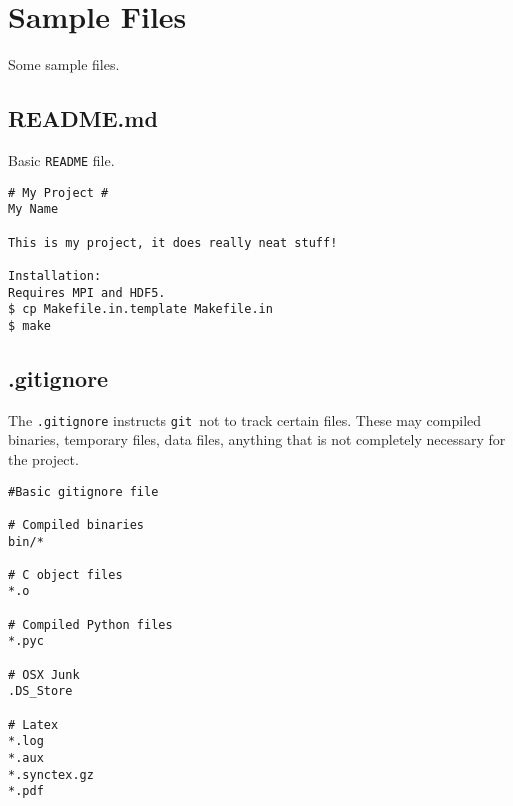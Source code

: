 \documentclass[14pt]{amsart}
\newcommand{\git}{{\texttt{git}}}
\begin{document}
\section{Sample Files}

Some sample files.

\subsection{README.md}

Basic \texttt{README} file.

\begin{lstlisting}
# My Project #
My Name

This is my project, it does really neat stuff!

Installation:
Requires MPI and HDF5.
$ cp Makefile.in.template Makefile.in
$ make

\end{lstlisting}

\subsection{.gitignore}

The \texttt{.gitignore} instructs \git\ not to track certain files.  These may compiled binaries, temporary files, data files, anything that is not completely necessary for the project.

\begin{lstlisting}
#Basic gitignore file

# Compiled binaries
bin/*

# C object files
*.o

# Compiled Python files
*.pyc

# OSX Junk
.DS_Store

# Latex
*.log
*.aux
*.synctex.gz
*.pdf
\end{lstlisting}
\end{document}
